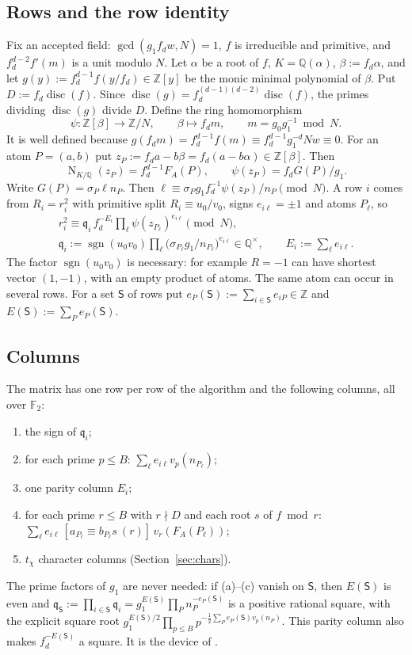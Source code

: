\documentclass[11pt]{amsart}
\theoremstyle{definition}
\newcommand{\Z}{\mathbb{Z}}
\newcommand{\Q}{\mathbb{Q}}
\newcommand{\F}{\mathbb{F}}
\newcommand{\sS}{\mathsf{S}}
\newcommand{\fq}{\mathfrak{q}}
\newcommand{\sgn}{\operatorname{sgn}}
\newcommand{\disc}{\operatorname{disc}}
\newcommand{\Norm}{\operatorname{N}}
\begin{document}
\subsection{Rows and the row identity}
Fix an accepted field: $\gcd(g_1f_dw,N)=1$, $f$ is irreducible and primitive, and $f_d^{d-2}f'(m)$ is a unit modulo $N$. Let $\alpha$ be a root
of $f$, $K=\Q(\alpha)$, $\beta:=f_d\alpha$, and let $g(y):=f_d^{d-1}f(y/f_d)\in\Z[y]$ be the monic minimal polynomial of $\beta$. Put
$D:=f_d\disc(f)$. Since $\disc(g)=f_d^{(d-1)(d-2)}\disc(f)$, the primes dividing $\disc(g)$ divide $D$. Define the ring homomorphism
\[
\psi:\Z[\beta]\to\Z/N,\qquad\beta\mapsto f_dm,\qquad m=g_0g_1^{-1}\bmod N .
\]
It is well defined because $g(f_dm)=f_d^{d-1}f(m)\equiv f_d^{d-1}g_1^{-d}Nw\equiv0$. For an atom $P=(a,b)$ put $z_P:=f_da-b\beta=f_d(a-b\alpha)\in\Z[\beta]$. Then
\[
\Norm_{K/\Q}(z_P)=f_d^{d-1}F_A(P),\qquad\psi(z_P)=f_dG(P)/g_1 .
\]
Write $G(P)=\sigma_P\ell n_P$. Then $\ell\equiv\sigma_Pg_1f_d^{-1}\psi(z_P)/n_P\pmod N$. A row $i$ comes from $R_i=r_i^2$ with primitive split
$R_i\equiv u_0/v_0$, signs $e_{i\ell}=\pm1$ and atoms $P_\ell$, so
\begin{equation}\label{eq:row}
\begin{gathered}
r_i^2\equiv\fq_i\,f_d^{-E_i}\prod_\ell\psi(z_{P_\ell})^{e_{i\ell}}\pmod N,\\
\fq_i:=\sgn(u_0v_0)\prod_\ell\bigl(\sigma_{P_\ell}g_1/n_{P_\ell}\bigr)^{e_{i\ell}}\in\Q^\times,\qquad E_i:=\sum_\ell e_{i\ell}.
\end{gathered}
\end{equation}
The factor $\sgn(u_0v_0)$ is necessary: for example $R=-1$ can have shortest vector $(1,-1)$, with an empty product of atoms. The same atom
can occur in several rows. For a set $\sS$ of rows put $e_P(\sS):=\sum_{i\in\sS}e_{iP}\in\Z$ and $E(\sS):=\sum_Pe_P(\sS)$.

\subsection{Columns}
The matrix has one row per row of the algorithm and the following columns, all over $\F_2$:
\begin{enumerate}[label=(\alph*)]
\item the sign of $\fq_i$;
\item for each prime $p\le B$: $\sum_\ell e_{i\ell}v_p(n_{P_\ell})$;
\item one parity column $E_i$;
\item for each prime $r\le B$ with $r\nmid D$ and each root $s$ of $f\bmod r$: $\sum_\ell e_{i\ell}\,[a_{P_\ell}\equiv b_{P_\ell}s\ (r)]\,v_r(F_A(P_\ell))$;
\item $t_\chi$ character columns (Section~\ref{sec:chars}).
\end{enumerate}
The prime factors of $g_1$ are never needed: if (a)--(c) vanish on $\sS$, then $E(\sS)$ is even and
$\fq_\sS:=\prod_{i\in\sS}\fq_i=g_1^{E(\sS)}\prod_Pn_P^{-e_P(\sS)}$ is a positive rational square, with the explicit square root
$g_1^{E(\sS)/2}\prod_{p\le B}p^{-\frac12\sum_Pe_P(\sS)v_p(n_P)}$. This parity column also makes $f_d^{-E(\sS)}$ a square. It is the device of
\cite[\S12.7]{blp1993}.
\end{document}
